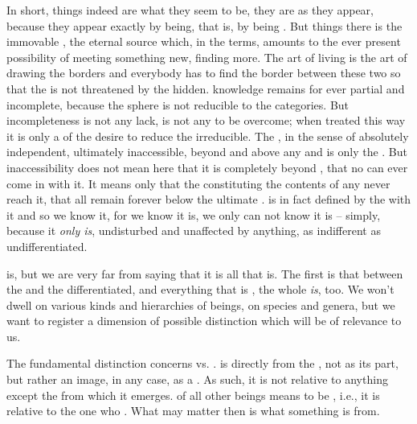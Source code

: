 \pa\label{pa:IndistinctNeedsNo} In short, things indeed are what they seem to be, they are as they appear,
because they appear exactly by being, that is, by being . But
 things there is the immovable , the eternal source which,
in the  terms, amounts to the ever present possibility of meeting
something new, finding more.  The art of living is the art of drawing the
borders and everybody has to find the border between these two  so
that the  is not threatened by the hidden.  knowledge
remains for ever partial and incomplete, because the  sphere is
not reducible to the  categories. But incompleteness is
not any lack, is not any  to be overcome; when treated this
way it is only a  of the desire to reduce the irreducible.  The
, in the sense of absolutely independent, ultimately
inaccessible, beyond and above any  and  is only
the .  But inaccessibility does not mean here that
it is completely beyond , that no  can ever come in
  with it.  It means only that the 
constituting the contents of any  never reach it, that all
 remain forever below the ultimate .   is in
fact defined by the  with it and so we know it, for we know
 it is, we only can not know  it is -- simply, because it
{\em only is}, undisturbed and unaffected by anything, as indifferent as
undifferentiated.



\label{asymm}
\pa\label{asymBeing}
 is, but we are very far from saying that it is all that
is. The first  is that between the  and the
differentiated, and 
everything that is , the whole  {\em is},
too.  
We won't dwell on various kinds and hierarchies of beings, on species and genera,
but we want to register a dimension of possible distinction which will be of
relevance to us. 

The fundamental distinction concerns  vs. .
 is  directly from the , not as its part,
but rather an image, in any case, as a . As such, it is not
relative to anything except the  from which it emerges.  of
all other beings means to be , i.e., it is relative to the one
who . What may matter then is what something is
 from.

